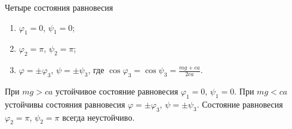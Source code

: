 Четыре состояния равновесия
\begin{enumerate}
	\item $\varphi _1 = 0$, $\psi _1 = 0$;
	\item $\varphi _2 = \pi$, $\psi _2 = \pi$;
	\item $\varphi = \pm\varphi _3$, $\psi = \pm \psi _3$,
	где $\cos{\varphi _3} = \cos{\psi _3} = \frac{mg + ca}{2ca}$.
\end{enumerate}
При $mg > ca$ устойчивое состояние равновесия $\varphi _1 = 0$, $\psi _1 = 0$.
При $mg < ca$ устойчивы состояния равновесия
$\varphi = \pm\varphi _3$, $\psi = \pm \psi _3$.
Состояние равновесия $\varphi _2 = \pi$, $\psi _2 = \pi$
всегда неустойчиво.
